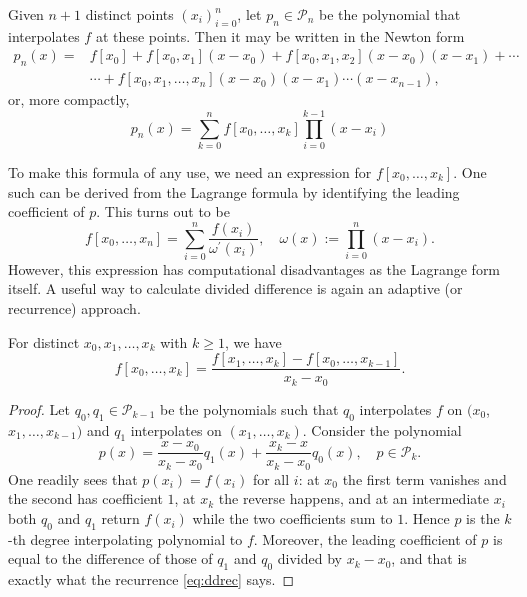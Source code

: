 \begin{theorem}
Given $n+1$ distinct points $\left(x_{i}\right)_{i=0}^{n}$, let $p_{n} \in \mathcal{P}_{n}$ be the polynomial that interpolates $f$ at these points. Then it may be written in the Newton form
\begin{align*}
  p_{n}(x)=& f\left[x_{0}\right]+f\left[x_{0}, x_{1}\right]\left(x-x_{0}\right)+f\left[x_{0}, x_{1}, x_{2}\right]\left(x-x_{0}\right)\left(x-x_{1}\right)+\cdots \\
  & \cdots+f\left[x_{0}, x_{1}, \ldots, x_{n}\right]\left(x-x_{0}\right)\left(x-x_{1}\right) \cdots\left(x-x_{n-1}\right),
\end{align*}
or, more compactly,
$$
p_{n}(x)=\sum_{k=0}^{n} f\left[x_{0}, \ldots, x_{k}\right] \prod_{i=0}^{k-1}\left(x-x_{i}\right)
$$
\end{theorem}

To make this formula of any use, we need an expression for $f[x_0, \dots, x_k]$. One such can be derived from the Lagrange formula by identifying the leading coefficient of $p$. This turns out to be
$$
f\left[x_{0}, \ldots, x_{n}\right]=\sum_{i=0}^{n} \frac{f\left(x_{i}\right)}{\omega^{\prime}\left(x_{i}\right)}, \quad \omega(x):=\prod_{i=0}^{n}\left(x-x_{i}\right) .
$$
However, this expression has computational disadvantages as the Lagrange form itself. A useful way to calculate divided difference is again an adaptive (or recurrence) approach.

\begin{theorem}
  For distinct $x_0, x_1, \dots, x_k$ with $k \geq 1$, we have
  \begin{equation}\label{eq:ddrec}
  f[x_0, \dots, x_k] = \frac{f[x_1, \dots, x_k] - f[x_0, \dots, x_{k - 1}]}{x_k - x_0}.
  \end{equation}
\end{theorem}
\begin{proof}
  Let $q_0, q_1 \in \mathcal{P}_{k - 1}$ be the polynomials such that $q_0$ interpolates $f$ on $(x_0$, $x_1, \dots, x_{k - 1})$ and $q_1$ interpolates on $(x_1, \dots, x_k)$. Consider the polynomial
  $$
  p(x)=\frac{x-x_{0}}{x_{k}-x_{0}} q_{1}(x)+\frac{x_{k}-x}{x_{k}-x_{0}} q_{0}(x), \quad p \in \mathcal{P}_{k} .
  $$
  One readily sees that $p\left(x_{i}\right)=f\left(x_{i}\right)$ for all $i$: at $x_0$ the first term vanishes and the second has coefficient $1$, at $x_k$ the reverse happens, and at an intermediate $x_i$ both $q_0$ and $q_1$ return $f(x_i)$ while the two coefficients sum to $1$. Hence $p$ is the $k$-th degree interpolating polynomial to $f$. Moreover, the leading coefficient of $p$ is equal to the difference of those of $q_{1}$ and $q_{0}$ divided by $x_{k}-x_{0}$, and that is exactly what the recurrence \eqref{eq:ddrec} says.
\end{proof}

